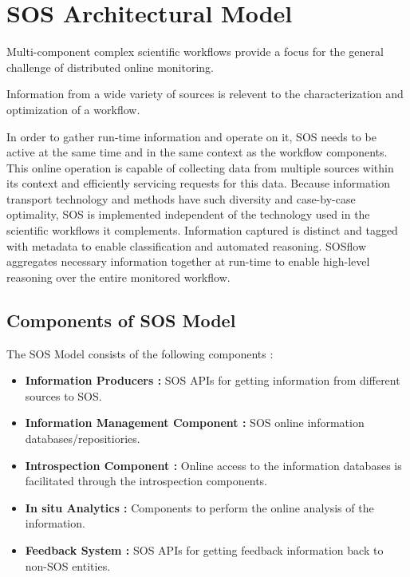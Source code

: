
\section{SOS Architectural Model}
%
%
Multi-component complex scientific workflows provide a focus for the
general challenge of distributed online monitoring.
%
%

Information from a wide variety of sources is relevent to the
characterization and optimization of a workflow.
%
\par
%
In order to gather run-time information and operate on it, SOS needs
to be active at the same time and in the same context as the workflow
components.
%
This online operation is capable of collecting data from multiple
sources within its context and efficiently servicing requests
for this data.
%
Because information transport technology and methods have such
diversity and case-by-case optimality, SOS is implemented
independent of the technology used in the scientific workflows it
complements.
%
Information captured is distinct and tagged with metadata to enable
classification and automated reasoning.
%
SOSflow aggregates necessary information together at run-time to
enable high-level reasoning over the entire monitored workflow.


\subsection{Components of SOS Model}

The SOS Model consists of the following components :
\begin{itemize}
\item \textbf{Information Producers :} 
SOS APIs for getting information from different sources to SOS.
\item \textbf{Information Management Component :}
SOS online information databases/repositiories.
\item \textbf{Introspection Component :} 
Online access to the information databases is facilitated through the introspection components.
\item \textbf{In situ Analytics :}
Components to perform the online analysis of the information.
\item \textbf{Feedback System :}
SOS APIs for getting feedback information back to non-SOS entities.
\end{itemize}


